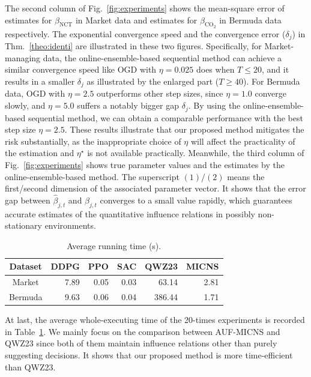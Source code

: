 \documentclass{article}
\theoremstyle{plain}
\theoremstyle{definition}
\theoremstyle{remark}
\def \Fig {Fig.}
\def \thm {Thm.}
\begin{document}
The second column of \Fig~\ref{fig:experiments} shows the mean-square error of estimates for $\beta_{\text{NCT}}$ in Market data and estimates for $\beta_{\text{CO}_2}$ in Bermuda data respectively. 
The exponential convergence speed and the convergence error ($\delta_j$) in \thm~\ref{theo:identi} are illustrated in these two figures. 
Specifically, for Market-managing data, the online-ensemble-based sequential method can achieve a similar convergence speed like OGD with $\eta=0.025$ does when $T\leq 20$, 
and it results in a smaller $\delta_j$ as illustrated by the enlarged part ($T\geq 40$). 
For Bermuda data, OGD with $\eta = 2.5$ outperforms other step sizes, since $\eta = 1.0$ converge slowly, and $\eta = 5.0$ suffers a notably bigger gap $\delta_j$. 
By using the online-ensemble-based sequential method, we can obtain a comparable performance with the best step size $\eta = 2.5$. 
These results illustrate that our proposed method mitigates the risk substantially, 
as the inappropriate choice of $\eta$ will affect the practicality of the estimation and $\eta^\star$ is not available practically. 
Meanwhile, 
the third column of \Fig~\ref{fig:experiments} shows true parameter values and the estimates by the online-ensemble-based method. 
The superscript $(1)$/$(2)$ means the first/second dimension of the associated parameter vector. 
It shows that the error gap between $\hat{\beta}_{j, t}$ and $\beta_{j, t}$ converges to a small value rapidly, 
which guarantees accurate estimates of the quantitative influence relations in possibly non-stationary environments. 
\setlength{\intextsep}{6pt}
\begin{table}
\caption{Average running time (s).}
\vskip -0.15in
\label{tab:time}
\begin{center}
\begin{small}
  \begin{tabular}{crrrrr}
    \toprule
    Dataset & DDPG & PPO & SAC & QWZ23 & MICNS\\
    \midrule
    Market &7.89 & 0.05  & 0.03  & 63.14 & 2.81 \\
    Bermuda & 9.63 & 0.06  & 0.04 &  386.44 & 1.71 \\
    \bottomrule
\end{tabular}
\vskip -0.15in
\end{small}
\end{center}
\end{table}

\vskip -0.15in
At last, the average whole-executing time of the 20-times experiments is recorded in Table~\ref{tab:time}. 
We mainly focus on the comparison between AUF-MICNS and QWZ23 since both of them maintain influence relations other than purely suggesting decisions. 
It shows that our proposed method is more time-efficient than QWZ23.
\end{document}
